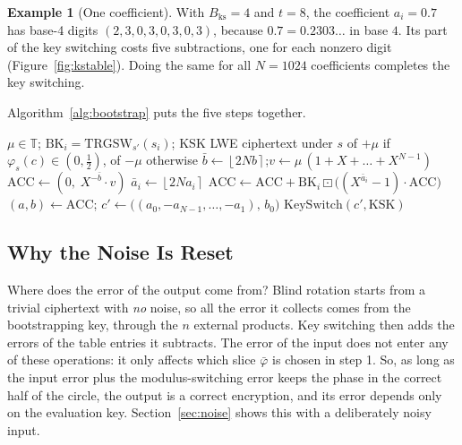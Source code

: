 \documentclass[12pt]{article}
\theoremstyle{plain}
\theoremstyle{definition}
\newtheorem{example}{Example}
\newcommand{\T}{\mathbb{T}}
\newcommand{\round}[1]{\left\lfloor #1 \right\rceil}
\newcommand{\Bks}{B_{\mathrm{ks}}}
\newcommand{\BK}{\mathrm{BK}}
\newcommand{\KSK}{\mathrm{KSK}}
\newcommand{\ext}{\boxdot}
\begin{document}
\begin{example}[One coefficient]
With $\Bks=4$ and $t=8$, the coefficient $a_i=0.7$ has base-4 digits
$(2,3,0,3,0,3,0,3)$, because $0.7=0.2303\ldots$ in base $4$. Its part of the key
switching costs five subtractions, one for each nonzero digit
(Figure~\ref{fig:kstable}). Doing the same for all $N=1024$ coefficients
completes the key switching.
\end{example}



Algorithm~\ref{alg:bootstrap} puts the five steps together.

\begin{algorithm}[!htb]
\caption{Gate bootstrapping of an LWE ciphertext $c=(\mathbf{a},b)$ under $s$}
\label{alg:bootstrap}
\begin{algorithmic}[1]
\Require $\mu\in\T$; $\BK_i=\mathrm{TRGSW}_{s'}(s_i)$; $\KSK$
\Ensure LWE ciphertext under $s$ of $+\mu$ if $\varphi_s(c)\in(0,\frac12)$, of $-\mu$ otherwise
\State $\bar b\gets\round{2Nb}$;\quad $v\gets\mu\,(1+X+\dots+X^{N-1})$
\State $\mathrm{ACC}\gets(0,\;X^{-\bar b}\cdot v)$ 
 
  \State $\bar a_i\gets\round{2Na_i}$
    \State $\mathrm{ACC}\gets\mathrm{ACC}+\BK_i\ext\big((X^{\bar a_i}-1)\cdot\mathrm{ACC}\big)$
  \EndIf
\EndFor
\State $(a,b)\gets\mathrm{ACC}$;\quad
       $c'\gets\big((a_0,-a_{N-1},\dots,-a_1),\,b_0\big)$
\State \Return $\mathrm{KeySwitch}(c',\KSK)$ 
\end{algorithmic}
\end{algorithm}

\subsection{Why the Noise Is Reset}
\label{sec:bsnoise}

Where does the error of the output come from? Blind rotation starts from a
trivial ciphertext with \emph{no} noise, so all the error it collects comes
from the bootstrapping key, through the $n$ external products. Key switching
then adds the errors of the table entries it subtracts. The error of the input
does not enter any of these operations: it only affects which slice
$\bar\varphi$ is chosen in step 1. So, as long as the input error plus the
modulus-switching error keeps the phase in the correct half of the circle, the
output is a correct encryption, and its error depends only on the evaluation
key. Section~\ref{sec:noise} shows this with a deliberately noisy input.
\end{document}
